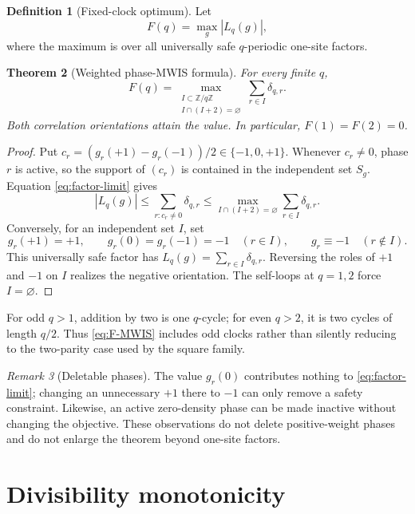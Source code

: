 \documentclass[11pt]{article}
\newtheorem{theorem}{Theorem}[section]
\theoremstyle{definition}
\newtheorem{definition}[theorem]{Definition}
\theoremstyle{remark}
\newtheorem{remark}[theorem]{Remark}
\newcommand{\Z}{\mathbb Z}
\newcommand{\dd}{\delta}
\begin{document}
\begin{definition}[Fixed-clock optimum]
Let
\[
              F(q)=\max_g |L_q(g)|,
\]
where the maximum is over all universally safe $q$-periodic one-site
factors.
\end{definition}

\begin{theorem}[Weighted phase-MWIS formula]
For every finite $q$,
\begin{equation}
 \boxed{\displaystyle
 F(q)=\max_{\substack{I\subset\Z/q\Z\\I\cap(I+2)=\varnothing}}
                  \sum_{r\in I}\dd_{q,r}.}
 \label{eq:F-MWIS}
\end{equation}
Both correlation orientations attain the value.  In particular,
$F(1)=F(2)=0$.
\end{theorem}

\begin{proof}
Put $c_r=(g_r(+1)-g_r(-1))/2\in\{-1,0,+1\}$.  Whenever $c_r\ne0$, phase
$r$ is active, so the support of $(c_r)$ is contained in the independent set
$S_g$.  Equation \eqref{eq:factor-limit} gives
\[
 |L_q(g)|\le\sum_{r:c_r\ne0}\dd_{q,r}
 \le\max_{I\cap(I+2)=\varnothing}\sum_{r\in I}\dd_{q,r}.
\]
Conversely, for an independent set $I$, set
\[
 g_r(+1)=+1,\qquad g_r(0)=g_r(-1)=-1\quad(r\in I),
 \qquad g_r\equiv-1\quad(r\notin I).
\]
This universally safe factor has $L_q(g)=\sum_{r\in I}\dd_{q,r}$.  Reversing
the roles of $+1$ and $-1$ on $I$ realizes the negative orientation.  The
self-loops at $q=1,2$ force $I=\varnothing$.
\end{proof}

For odd $q>1$, addition by two is one $q$-cycle; for even $q>2$, it is two
cycles of length $q/2$.  Thus \eqref{eq:F-MWIS} includes odd clocks rather
than silently reducing to the two-parity case used by the square family.

\begin{remark}[Deletable phases]
The value $g_r(0)$ contributes nothing to \eqref{eq:factor-limit}; changing
an unnecessary $+1$ there to $-1$ can only remove a safety constraint.
Likewise, an active zero-density phase can be made inactive without changing
the objective.  These observations do not delete positive-weight phases and
do not enlarge the theorem beyond one-site factors.
\end{remark}

\section{Divisibility monotonicity}
\end{document}
